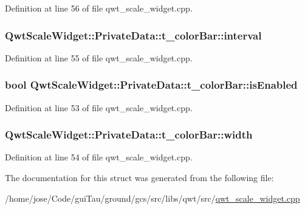 Definition at line 56 of file qwt\-\_\-scale\-\_\-widget.\-cpp.

\hypertarget{struct_qwt_scale_widget_1_1_private_data_1_1t__color_bar_a1adf56cd6200452a27d30082c297a55b}{
\subsubsection[{interval}]{ Qwt\-Scale\-Widget\-::\-Private\-Data\-::t\-\_\-color\-Bar\-::interval}}\label{struct_qwt_scale_widget_1_1_private_data_1_1t__color_bar_a1adf56cd6200452a27d30082c297a55b}


Definition at line 55 of file qwt\-\_\-scale\-\_\-widget.\-cpp.

\hypertarget{struct_qwt_scale_widget_1_1_private_data_1_1t__color_bar_adeebf948ce41ae1fc7aa9033b9012cba}{
\subsubsection[{is\-Enabled}]{\setlength{\rightskip}{0pt plus 5cm}bool Qwt\-Scale\-Widget\-::\-Private\-Data\-::t\-\_\-color\-Bar\-::is\-Enabled}}\label{struct_qwt_scale_widget_1_1_private_data_1_1t__color_bar_adeebf948ce41ae1fc7aa9033b9012cba}


Definition at line 53 of file qwt\-\_\-scale\-\_\-widget.\-cpp.

\hypertarget{struct_qwt_scale_widget_1_1_private_data_1_1t__color_bar_a31caea5a9c042201cc14dc86197ce281}{
\subsubsection[{width}]{ Qwt\-Scale\-Widget\-::\-Private\-Data\-::t\-\_\-color\-Bar\-::width}}\label{struct_qwt_scale_widget_1_1_private_data_1_1t__color_bar_a31caea5a9c042201cc14dc86197ce281}


Definition at line 54 of file qwt\-\_\-scale\-\_\-widget.\-cpp.



The documentation for this struct was generated from the following file\-:\begin{DoxyCompactItemize}
\item 
/home/jose/\-Code/gui\-Tau/ground/gcs/src/libs/qwt/src/\hyperlink{qwt__scale__widget_8cpp}{qwt\-\_\-scale\-\_\-widget.\-cpp}\end{DoxyCompactItemize}
